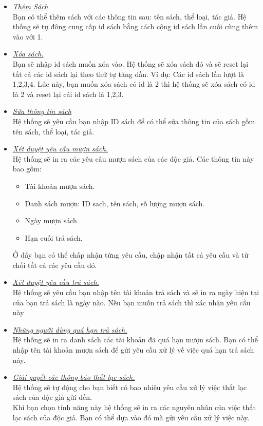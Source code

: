 \documentclass[16pt,a4paper,oneside]{article}
\begin{document}
\begin{itemize}
	\item \underline{\textit{Thêm Sách}}\\
	Bạn có thể thêm sách với các thông tin sau: tên sách, thể loại, tác giả. Hệ thống sẽ tự đông cung cấp id sách bằng cách cộng id sách lần cuối cùng thêm vào với 1.
	\item \underline{\textit{Xóa sách.}}\\
	Bạn sẽ nhập id sách muốn xóa vào. Hệ thống sẽ xóa sách đó và sẽ reset lại tất cả các id sách lại theo thứ tự tăng dần. Ví dụ: Các id sách lần lượt là 1,2,3,4. Lúc này, bạn muốn xóa sách có id là 2 thì hệ thống sẽ xóa sách có id là 2 và reset lại cái id sách là 1,2,3.
	\item \underline{\textit{Sửa thông tin sách}}\\
	Hệ thống sẽ yêu cầu bạn nhập ID sách để có thể sửa thông tin của sách gồm tên sách, thể loại, tác giả.
	\item \underline{\textit{Xét duyệt yêu cầu mượn sách.}}\\
	Hệ thống sẽ in ra các yêu câu mượn sách của các độc giả. Các thông tin này bao gồm:
\begin{itemize}
	\item Tài khoản mượn sách.
	\item Danh sách mượn: ID sach, tên sách, số lượng mượn sách.
	\item Ngày mượn sách.
	\item Hạn cuối trả sách.
\end{itemize}
Ở đây bạn có thể chấp nhận từng yêu cầu, chập nhận tất cả yêu cầu và từ chối tất cả các yêu cầu đó.
	\item \underline{\textit{Xét duyệt yêu cầu trả sách.}}\\
	Hệ thống sẽ yêu cầu bạn nhập tên tài khoản trả sách và sẽ in ra ngày hiện tại của bạn trả sách là ngày nào. Nếu bạn muốn trả sách thì xác nhận yêu cầu này
	\item \underline{\textit{Những người dùng quá hạn trả sách.}}\\
	Hệ thống sẽ in ra danh sách các tài khoản đã quá hạn mượn sách. Bạn có thể nhập tên tài khoản mượn sách để gửi yêu cầu xử lý về việc quá hạn trả sách này.
	\item \underline{\textit{Giải quyết các thông báo thất lạc sách.}}\\
		Hệ thống sẽ tự động cho bạn biết có bao nhiêu yêu cầu xử lý việc thất lạc sách của độc giả gửi đến. \\
		Khi bạn chọn tính năng này hệ thống sẽ in ra các nguyên nhân của việc thất lạc sách của độc giả. Bạn có thể dựa vào đó mà gửi yêu cầu xử lý việc này.
\end{itemize}
\end{document}
